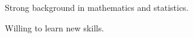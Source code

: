 

\begin{cventries}

  \cventry
    {} %
    {} %
    {} %
    {} %
    {
      \begin{cvitems} %
      \item Strong background in mathematics and statistics.
      \item Willing to learn new skills.
      \end{cvitems}
    }


\end{cventries}

